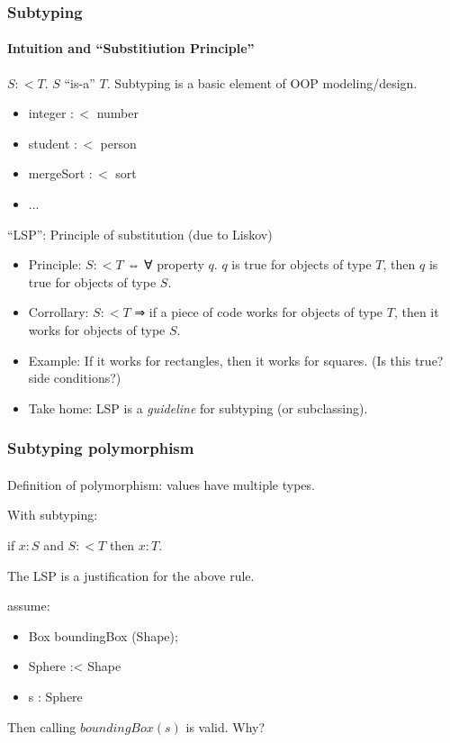 \documentclass{beamer}
\begin{document}
\begin{frame}[fragile]
\frametitle{Subtyping}
\framesubtitle{Intuition and ``Substitiution Principle''}


$S :< T$. $S$ ``is-a'' $T$. 
Subtyping is a basic element of OOP modeling/design.

\begin{itemize}
  \item integer $:<$ number
  \item student $:<$ person
  \item mergeSort $:<$ sort
  \item ...
\end{itemize}

``LSP'': Principle of substitution (due to Liskov)
\begin{itemize}
  \item Principle: $S :< T$ ⇔ ∀ property $q$. $q$ is true for objects of type $T$, then $q$ is true for objects of type $S$.
  \item Corrollary: $S :< T$ ⇒ if a piece of code works for objects of type $T$, then it works for objects of type $S$.
  \item Example: If it works for rectangles, then it works for squares. (Is this true? side conditions?)
  \item Take home: LSP is a \emph{guideline} for subtyping (or subclassing).
\end{itemize}

\end{frame}


\begin{frame}
\frametitle{Subtyping polymorphism}
\framesubtitle{}

Definition of polymorphism: values have multiple types.

With subtyping:

if $x : S$ and $S :< T$ then $x : T$.

The LSP is a justification for the above rule.

\begin{example}
  assume: 
  \begin{itemize}
  \item Box boundingBox (Shape);
  \item Sphere :< Shape
  \item s : Sphere
  \end{itemize}
  Then calling $boundingBox(s)$ is valid. Why?  
\end{example}

\end{frame}
\end{document}
